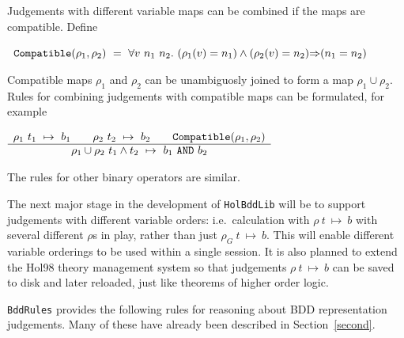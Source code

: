 \documentclass[12pt]{article}
\newcommand{\ml}[1]{{\tt #1}}
\newcommand{\termbdd}[3]{\mbox{$#1~#2~\mapsto~#3$}}
\newcommand\Hol{Hol98\xspace}
\newcommand\imp{{\Rightarrow}}
\begin{document}
\smallskip

Judgements with different variable maps can be combined if the maps are compatible.
Define 

\smallskip

~$\ml{Compatible}(\rho_1,\rho_2)~=~\forall v~n_1~n_2.~(\rho_1(v)=n_1)\wedge(\rho_2(v)=n_2)\imp(n_1=n_2)$

\smallskip

\noindent Compatible maps $\rho_1$ and $\rho_2$ can be unambiguosly
joined to form a map $\rho_1\cup \rho_2$. Rules for combining
judgements with compatible maps can be formulated, for example

\smallskip

$\begin{array}{c}
\termbdd{\rho_1}{t_1}{b_1} \qquad \termbdd{\rho_2}{t_2}{b_2} \qquad \ml{Compatible}(\rho_1,\rho_2)
\\ \hline
\termbdd{\rho_1\cup\rho_2}{t_1\wedge t_2}{b_1~\ml{AND}~ b_2}
\end{array}$


\smallskip

\noindent The rules for other binary operators are similar.

The next major stage in the development of \ml{HolBddLib} will be to
support judgements with different variable orders: i.e.~calculation
with $\termbdd{\rho}{t}{b}$ with several different $\rho$s in play,
rather than just $\termbdd{\rho_G}{t}{b}$. This will enable different
variable orderings to be used within a single session. It is also
planned to extend the \Hol{} theory management system so that
judgements $\termbdd{\rho}{t}{b}$ can be saved to disk and later
reloaded, just like theorems of higher order logic.

\ml{BddRules} provides the following rules for reasoning
about BDD representation judgements. Many of these have already been described in
Section~\ref{second}.
\end{document}
